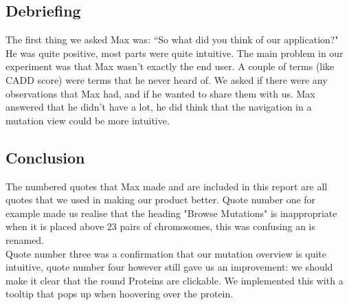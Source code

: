 \subsection{Debriefing}
The first thing we asked Max was: ``So what did you think of our application?" He was quite positive, most parts were quite intuitive. The main problem in our experiment was that Max wasn't exactly the end user. A couple of terms (like CADD score) were terms that he never heard of. We asked if there were any observations that Max had, and if he wanted to share them with us. Max answered that he didn't have a lot, he did think that the navigation in a mutation view could be more intuitive. 
\subsection{Conclusion}
The numbered quotes that Max made and are included in this report are all quotes that we used in making our product better. Quote number one for example made us realise that the heading "Browse Mutations" is inappropriate when it is placed above 23 pairs of chromosomes, this was confusing an is renamed. \\
Quote number three was a confirmation that our mutation overview is quite intuitive, quote number four however still gave us an improvement: we should make it clear that the round Proteins are clickable. We implemented this with a tooltip that pops up when hoovering over the protein.  
